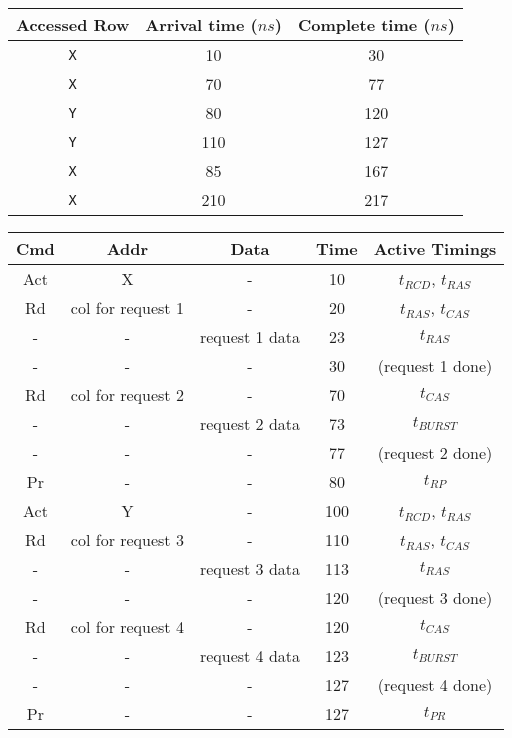 \documentclass[a4paper, 11pt]{exam}
\begin{document}
\begin{enumerate}
\begin{center}
	\begin{tabular}{|c|c|c|}
		\hline
		\textbf{Accessed Row} & \textbf{Arrival time ($ns$)} & \textbf{Complete time ($ns$)} \\
		\hline
		\texttt{X}  & 10 & 30\\
		\hline
		\texttt{X}  & 70 & 77\\
		\hline
		\texttt{Y}  & 80 & 120\\
		\hline
		\texttt{Y}  & 110 & 127\\
		\hline
		\texttt{X}  & 85 & 167\\
		\hline
		\texttt{X} & 210 & 217\\
		\hline
	\end{tabular}
\end{center}
\begin{center}
	\begin{tabular}{|c|c|c|c|c|}
		\hline
		\textbf{Cmd} & \textbf{Addr} & \textbf{Data} & \textbf{Time} & \textbf{Active Timings}\\
		\hline
		Act & X & - & 10 & $t_{RCD}$, $t_{RAS}$\\ 
		\hline
		Rd & col for request 1 & - & 20 &  $t_{RAS}$, $t_{CAS}$\\
		\hline
		- & - & request 1 data & 23 & $t_{RAS}$ \\
		\hline
		- & - & - & 30 & (request 1 done)\\
		\hline
		Rd & col for request 2 & - & 70 & $t_{CAS}$ \\
		\hline
		- & - & request 2 data & 73 & $t_{BURST}$ \\
		\hline
		- & - & - & 77 & (request 2 done) \\
		\hline
		Pr & - & - & 80 & $t_{RP}$ \\
		\hline
		Act & Y & - & 100 & $t_{RCD}$, $t_{RAS}$ \\
		\hline
		Rd & col for request 3 & - & 110 & $t_{RAS}$, $t_{CAS}$ \\
		\hline
		- & - & request 3 data & 113 & $t_{RAS}$ \\
		\hline
		- & - & - & 120 & (request 3 done) \\
		\hline
		Rd & col for request 4 & - & 120 & $t_{CAS}$ \\
		\hline
		- & - & request 4 data & 123 & $t_{BURST}$ \\
		\hline
		- & - & - & 127 & (request 4 done) \\
		\hline
		Pr & - & - & 127 & $t_{PR}$ \\

\end{tabular}
\end{center}
\end{enumerate}
\end{document}
